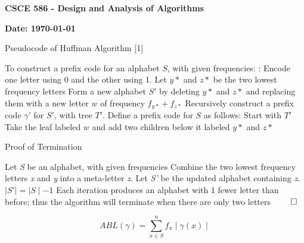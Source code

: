 \documentclass{article}
\newcommand{\tab}[1][1]{\noindent \hspace{#1cm} }
\begin{document}
\noindent \textbf{CSCE 586 - Design and Analysis of Algorithms}

\noindent \textbf{Date:  \today }

\hrulefill

\begin{algorithm} %
\caption{Pseudocode of Huffman Algorithm [1]} %
\begin{algorithmic} %
    \State To construct a prefix code for an alphabet $S$, with given frequencies:
     :
    	\State Encode one letter using 0 and the other using 1.
    \Else {:}
    	\State Let $y*$ and $z*$ be the two lowest frequency letters
    	\State Form a new alphabet $S'$ by deleting $y*$ and $z*$ and replacing them with a new letter $w$ of frequency $f_{y*} + f_{z*}$
    	\State Recursively construct a prefix code $\gamma '$ for $S'$, with tree $T'$.
    	\State Define a prefix code for $S$ as follows:
    	\State \tab Start with $T'$
    	\State \tab Take the leaf labeled $w$ and add two children below it labeled $y*$ and $z*$ 
    \EndIf 
\end{algorithmic}
\end{algorithm}

\begin{algorithm} %
\caption{Proof of Termination} %
\begin{algorithmic} %
    \State Let \textit{S} be an alphabet, with given frequencies
    \State Combine the two lowest frequency letters \textit{x} and \textit{y} into a meta-letter \textit{z}.
    \State Let \textit{S'} be the updated alphabet containing \textit{z}.  
    \State $\mid S' \mid = \mid S \mid - 1$  
    \State Each iteration produces an alphabet with 1 fewer letter than before; thus the algorithm will terminate when there are only two letters $\qedhere$
\end{algorithmic}
\end{algorithm}

\begin{equation}
ABL(\gamma) = \sum_{x \in S}^{n} f_x \mid \gamma(x) \mid
\end{equation}
\end{document}
